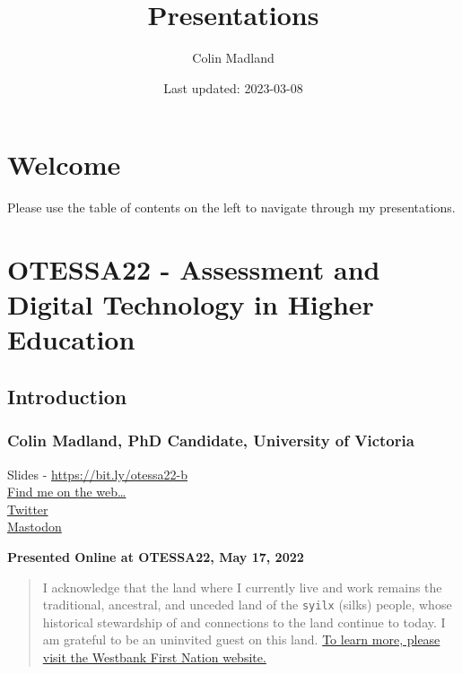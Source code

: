 \documentclass[
]{book}
\title{Presentations}
\author{Colin Madland}
\date{Last updated: 2023-03-08}
\begin{document}
\maketitle

{
\setcounter{tocdepth}{1}
\tableofcontents
}
\hypertarget{welcome}{%
\chapter*{Welcome}\label{welcome}}

Please use the table of contents on the left to navigate through my presentations.

\hypertarget{otessa22---assessment-and-digital-technology-in-higher-education}{%
\chapter{OTESSA22 - Assessment and Digital Technology in Higher Education}\label{otessa22---assessment-and-digital-technology-in-higher-education}}

\hypertarget{introduction}{%
\section*{Introduction}\label{introduction}}

\hypertarget{colin-madland-phd-candidate-university-of-victoria}{%
\subsection*{Colin Madland, PhD Candidate, University of Victoria}\label{colin-madland-phd-candidate-university-of-victoria}}

Slides - \url{https://bit.ly/otessa22-b}\\
\href{https://cmad.land}{Find me on the web\ldots{}}\\
\href{https://twitter.com/colinmadland}{Twitter}\\
\href{https://scholar.social/web/@Cmadland}{Mastodon}

\textbf{Presented Online at OTESSA22, May 17, 2022}

\begin{quote}
I acknowledge that the land where I currently live and work remains the traditional, ancestral, and unceded land of the \texttt{syilx} (silks) people, whose historical stewardship of and connections to the land continue to today. I am grateful to be an uninvited guest on this land. \href{https://wfn.ca}{To learn more, please visit the Westbank First Nation website.}
\end{quote}
\end{document}
